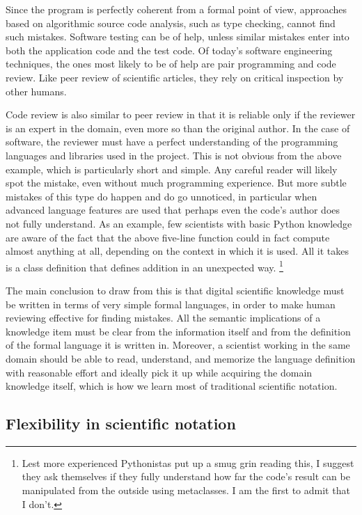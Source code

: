 Since the program is perfectly coherent from a formal point of view, approaches based on algorithmic source code analysis, such as type checking, cannot find such mistakes. Software testing can be of help, unless similar mistakes enter into both the application code and the test code. Of today's software engineering techniques, the ones most likely to be of help are pair programming and code review. Like peer review of scientific articles, they rely on critical inspection by other humans.

Code review is also similar to peer review in that it is reliable only if the reviewer is an expert in the domain, even more so than the original author. In the case of software, the reviewer must have a perfect understanding of the programming languages and libraries used in the project. This is not obvious from the above example, which is particularly short and simple. Any careful reader will likely spot the mistake, even without much programming experience. But more subtle mistakes of this type do happen and do go unnoticed, in particular when advanced language features are used that perhaps even the code's author does not fully understand. As an example, few scientists with basic Python knowledge are aware of the fact that the above five-line function could in fact compute almost anything at all, depending on the context in which it is used. All it takes is a class definition that defines addition in an unexpected way. \footnote{Lest more experienced Pythonistas put up a smug grin reading this, I suggest they ask themselves if they fully understand how far the code's result can be manipulated from the outside using metaclasses. I am the first to admit that I don't.}

The main conclusion to draw from this is that digital scientific knowledge must be written in terms of very simple formal languages, in order to make human reviewing effective for finding mistakes. All the semantic implications of a knowledge item must be clear from the information itself and from the definition of the formal language it is written in. Moreover, a scientist working in the same domain should be able to read, understand, and memorize the language definition with reasonable effort and ideally pick it up while acquiring the domain knowledge itself, which is how we learn most of traditional scientific notation.

\subsection{Flexibility in scientific notation}
\label{flexibility}

